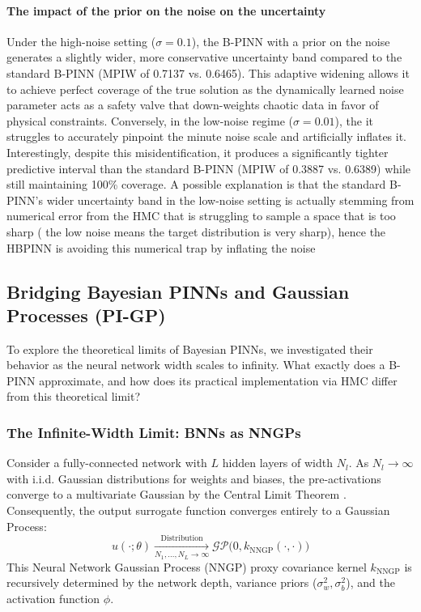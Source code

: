 \documentclass{article}
\begin{document}
\paragraph{The impact of the prior on the noise on the uncertainty}
Under the high-noise setting ($\sigma = 0.1$), the B-PINN with a prior on the noise generates a slightly wider, more conservative uncertainty band compared to the standard B-PINN (MPIW of 0.7137 vs. 0.6465). This adaptive widening allows it to achieve perfect coverage of the true solution as the dynamically learned noise parameter acts as a safety valve that down-weights chaotic data in favor of physical constraints. Conversely, in the low-noise regime ($\sigma = 0.01$), the it struggles to accurately pinpoint the minute noise scale and artificially inflates it. Interestingly, despite this misidentification, it produces a significantly tighter predictive interval than the standard B-PINN (MPIW of 0.3887 vs. 0.6389) while still maintaining 100\% coverage.
A possible explanation is that the standard B-PINN's wider uncertainty band in the low-noise setting is actually stemming from numerical error from the HMC that is struggling to sample a space that is too sharp ( the low noise means the target distribution is very sharp), hence the HBPINN is avoiding this numerical trap by inflating the noise

\subsection{Bridging Bayesian PINNs and Gaussian Processes (PI-GP)}
To explore the theoretical limits of Bayesian PINNs, we investigated their behavior as the neural network width scales to infinity. What exactly does a B-PINN approximate, and how does its practical implementation via HMC differ from this theoretical limit?

\subsubsection{The Infinite-Width Limit: BNNs as NNGPs}
Consider a fully-connected network with $L$ hidden layers of width $N_l$. As $N_l \to \infty$ with i.i.d. Gaussian distributions for weights and biases, the pre-activations converge to a multivariate Gaussian by the Central Limit Theorem \cite{Lee2018}. Consequently, the output surrogate function converges entirely to a Gaussian Process:
\begin{equation*}
u(\cdot;\theta) \xrightarrow[N_1, \dots, N_L \to \infty]{\text{Distribution}} \mathcal{GP}\big(0, k_{\text{NNGP}}(\cdot, \cdot)\big)
\end{equation*}
This Neural Network Gaussian Process (NNGP) proxy covariance kernel $k_{\text{NNGP}}$ is recursively determined by the network depth, variance priors ($\sigma_w^2, \sigma_b^2$), and the activation function $\phi$.
\end{document}
